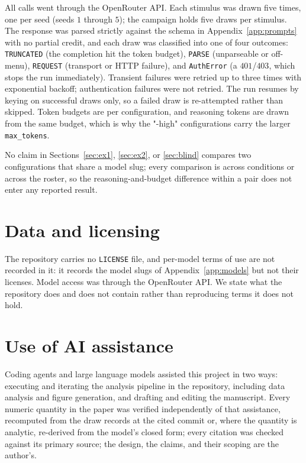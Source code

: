 \documentclass{article}
\theoremstyle{plain}
\theoremstyle{definition}
\theoremstyle{remark}
\begin{document}
All calls went through the OpenRouter API. Each stimulus was drawn five times,
one per seed (seeds $1$ through $5$); the campaign holds five draws per stimulus.
The response was parsed strictly against the schema in
Appendix~\ref{app:prompts} with no partial credit, and each draw was classified
into one of four outcomes: \texttt{TRUNCATED} (the completion hit the token
budget), \texttt{PARSE} (unparseable or off-menu), \texttt{REQUEST} (transport
or HTTP failure), and \texttt{AuthError} (a $401$/$403$, which stops the run
immediately). Transient failures were retried up to three times with exponential
backoff; authentication failures were not retried. The run resumes by keying on
successful draws only, so a failed draw is re-attempted rather than skipped.
Token budgets are per configuration, and reasoning tokens are drawn from the same
budget, which is why the "-high" configurations carry the larger \texttt{max\_tokens}.

No claim in Sections~\ref{sec:ex1}, \ref{sec:ex2}, or \ref{sec:blind} compares
two configurations that share a model slug; every comparison is across conditions
or across the roster, so the reasoning-and-budget difference within a pair does
not enter any reported result.

\section{Data and licensing}\label{app:data}

The repository carries no \texttt{LICENSE} file, and per-model terms of use are
not recorded in it: it records the model slugs of Appendix~\ref{app:models} but
not their licenses. Model access was through the OpenRouter API. We state what
the repository does and does not contain rather than reproducing terms it does
not hold.

\section{Use of AI assistance}\label{app:ai}

Coding agents and large language models assisted this project in two ways:
executing and iterating the analysis pipeline in the repository, including data
analysis and figure generation, and drafting and editing the manuscript. Every
numeric quantity in the paper was verified independently of that assistance,
recomputed from the draw records at the cited commit or, where the quantity is
analytic, re-derived from the model's closed form; every citation was checked
against its primary source; the design, the claims, and their scoping are the
author's.
\end{document}
